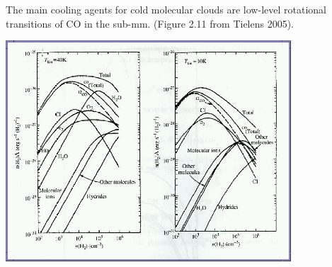 \begin{frame}
The main cooling agents for cold molecular clouds are low-level
rotational transitions of CO in the sub-mm. (Figure 2.11 from Tielens
2005).
\begin{center}
\includegraphics[width=0.8\textwidth,height=!]{./B/CO_cooling_Tielens.jpg}
\end{center}




\end{frame} 


